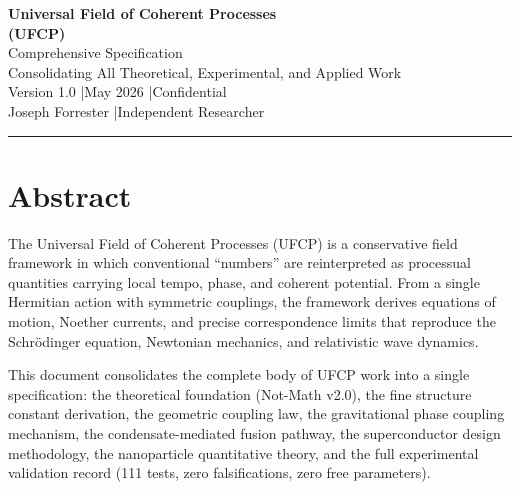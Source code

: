 \documentclass[11pt, a4paper]{article}
\begin{document}
\begin{center}
  {\LARGE \textbf{Universal Field of Coherent Processes}}\\[6pt]
  {\LARGE \textbf{(UFCP)}}\\[8pt]
  {\large Comprehensive Specification}\\[4pt]
  {\large Consolidating All Theoretical, Experimental, and Applied Work}\\[10pt]
  {\color{nm-gray}\small Version 1.0 \quad|\quad May 2026 \quad|\quad Confidential}\\[4pt]
  {\color{nm-gray}\small Joseph Forrester \quad|\quad Independent Researcher}
\end{center}

\vspace{1em}
\hrule
\vspace{1em}

\section*{Abstract}

The Universal Field of Coherent Processes (UFCP) is a conservative
field framework in which conventional ``numbers'' are reinterpreted
as processual quantities carrying local tempo, phase, and coherent
potential. From a single Hermitian action with symmetric couplings,
the framework derives equations of motion, Noether currents, and
precise correspondence limits that reproduce the Schr\"odinger
equation, Newtonian mechanics, and relativistic wave dynamics.

This document consolidates the complete body of UFCP work into a
single specification: the theoretical foundation (Not-Math v2.0),
the fine structure constant derivation, the geometric coupling law,
the gravitational phase coupling mechanism, the condensate-mediated
fusion pathway, the superconductor design methodology, the
nanoparticle quantitative theory, and the full experimental
validation record (111 tests, zero falsifications, zero free
parameters).
\end{document}
